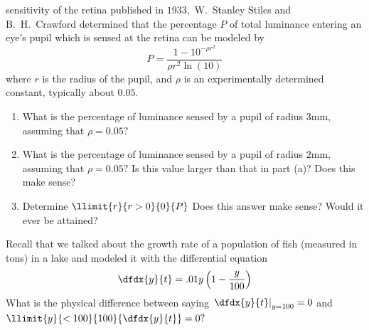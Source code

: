 \begin{ProblemSection}
\begin{embeddedproblem}{}
        sensitivity of the retina published in $1933,$ W.~Stanley
        Stiles and B.~H.~Crawford determined that the percentage $P$
        of total luminance entering an eye's pupil which is sensed at
        the retina can be modeled by
        $$
        P=\frac{1-10^{-\rho{}r^2}}{\rho{}r^2  \ln(10)}
        $$
        where $r$ is the radius of the pupil, and $\rho{}$ is an experimentally
        determined constant, typically about $0.05.$
        \begin{enumerate}[label={\bf{}(\alph*)}]
        \item What is the percentage of luminance sensed by a pupil of
          radius $3$mm, assuming that $\rho=0.05?$
        \item What is the percentage of luminance sensed by a pupil of
          radius $2$mm, assuming that
          $\rho=0.05?$ Is this value larger than that in part (a)?
          Does this make sense?
        \item Determine
          $\llimit{r}{r>0}{0}{P}$ Does this answer make sense?  Would it
          ever be attained?
        \end{enumerate}
      \end{embeddedproblem}
      \begin{embeddedproblem}{}
        Recall that we talked about the growth rate of a population of
        fish (measured in tons) in a lake and modeled it with the
        differential equation
        $$
        \dfdx{y}{t}=.01y\left(1-\frac{y}{100}\right)
        $$
        What is the physical difference between saying
        $\left.\dfdx{y}{t}\right|_{y=100}=0$ and
        $\llimit{y}{<100}{100}{\dfdx{y}{t}}=0?$
      \end{embeddedproblem}
    \end{ProblemSection}

